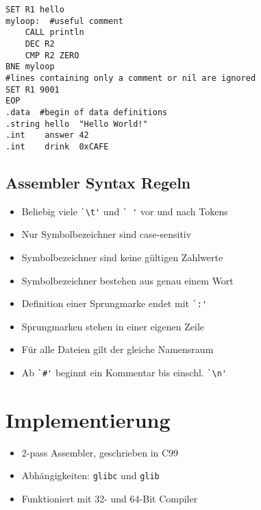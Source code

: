 \begin{frame}[fragile]{\insertsubsection}
\begin{verbatim}
SET R1 hello
myloop:  #useful comment
    CALL println
    DEC R2
    CMP R2 ZERO
BNE myloop
#lines containing only a comment or nil are ignored
SET R1 9001
EOP
.data  #begin of data definitions
.string hello  "Hello World!"
.int    answer 42
.int    drink  0xCAFE
\end{verbatim}
\end{frame}

\subsection{Assembler Syntax Regeln}

\begin{frame}[fragile]{\insertsubsection}
    \begin{itemize}
        \item Beliebig viele \verb#`\t'# und \verb*#` '# vor und nach Tokens
        \item Nur Symbolbezeichner sind case-sensitiv
        \item Symbolbezeichner sind keine gültigen Zahlwerte
        \item Symbolbezeichner bestehen aus genau einem Wort
    \end{itemize}
\end{frame}

\begin{frame}[fragile]{\insertsubsection}
    \begin{itemize}
        \item Definition einer Sprungmarke endet mit \verb#`:'#
        \item Sprungmarken stehen in einer eigenen Zeile
        \item Für alle Dateien gilt der gleiche Namensraum
        \item Ab \verb|`#'| beginnt ein Kommentar bis einschl. \verb#`\n'#
    \end{itemize}
\end{frame}

\section{Implementierung}

\begin{frame}[fragile]{\insertsection}
    \begin{itemize}
        \item 2-pass Assembler, geschrieben in C99
        \item Abhängigkeiten: \texttt{glibc} und \texttt{glib}
        \item Funktioniert mit 32- und 64-Bit Compiler
    \end{itemize}
\end{frame}

